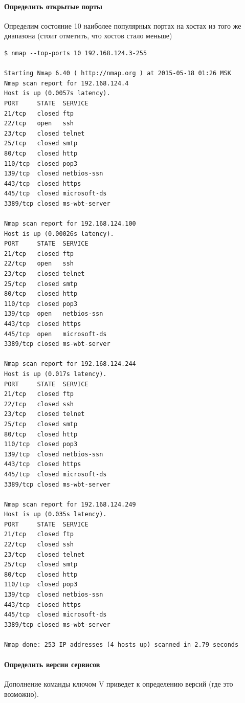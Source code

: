 \documentclass[a4paper, 12pt]{article}		%
\begin{document}
\paragraph{Определить открытые порты}

Определим состояние 10 наиболее популярных портах на хостах из того же диапазона (стоит отметить, что хостов стало меньше)

\begin{Verbatim}[frame=single]
$ nmap --top-ports 10 192.168.124.3-255

Starting Nmap 6.40 ( http://nmap.org ) at 2015-05-18 01:26 MSK
Nmap scan report for 192.168.124.4
Host is up (0.0057s latency).
PORT     STATE  SERVICE
21/tcp   closed ftp
22/tcp   open   ssh
23/tcp   closed telnet
25/tcp   closed smtp
80/tcp   closed http
110/tcp  closed pop3
139/tcp  closed netbios-ssn
443/tcp  closed https
445/tcp  closed microsoft-ds
3389/tcp closed ms-wbt-server

Nmap scan report for 192.168.124.100
Host is up (0.00026s latency).
PORT     STATE  SERVICE
21/tcp   closed ftp
22/tcp   open   ssh
23/tcp   closed telnet
25/tcp   closed smtp
80/tcp   closed http
110/tcp  closed pop3
139/tcp  open   netbios-ssn
443/tcp  closed https
445/tcp  open   microsoft-ds
3389/tcp closed ms-wbt-server

Nmap scan report for 192.168.124.244
Host is up (0.017s latency).
PORT     STATE  SERVICE
21/tcp   closed ftp
22/tcp   closed ssh
23/tcp   closed telnet
25/tcp   closed smtp
80/tcp   closed http
110/tcp  closed pop3
139/tcp  closed netbios-ssn
443/tcp  closed https
445/tcp  closed microsoft-ds
3389/tcp closed ms-wbt-server

Nmap scan report for 192.168.124.249
Host is up (0.035s latency).
PORT     STATE  SERVICE
21/tcp   closed ftp
22/tcp   closed ssh
23/tcp   closed telnet
25/tcp   closed smtp
80/tcp   closed http
110/tcp  closed pop3
139/tcp  closed netbios-ssn
443/tcp  closed https
445/tcp  closed microsoft-ds
3389/tcp closed ms-wbt-server

Nmap done: 253 IP addresses (4 hosts up) scanned in 2.79 seconds
\end{Verbatim}

\paragraph{Определить версии сервисов} Дополнение команды ключом V приведет к определению версий (где это возможно).
\end{document}
